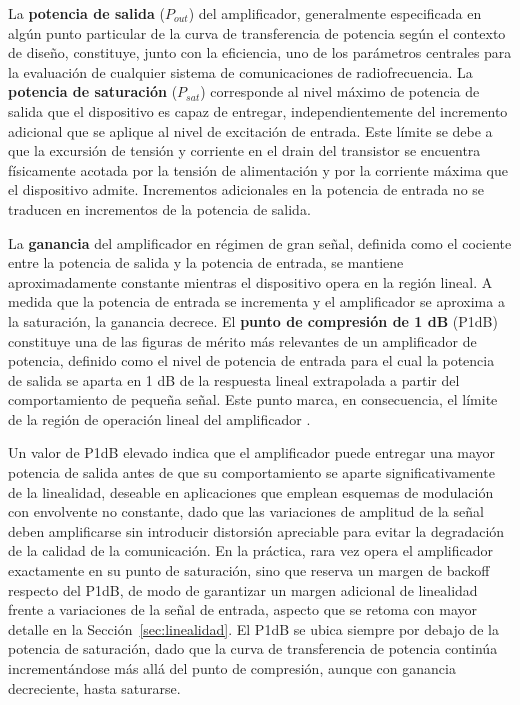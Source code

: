 La \textbf{potencia de salida} ($P_{out}$) del amplificador, generalmente especificada en algún punto particular de la curva de transferencia de potencia según el contexto de diseño, constituye, junto con la eficiencia, uno de los parámetros centrales para la evaluación de cualquier sistema de comunicaciones de radiofrecuencia. La \textbf{potencia de saturación} ($P_{sat}$) corresponde al nivel máximo de potencia de salida que el dispositivo es capaz de entregar, independientemente del incremento adicional que se aplique al nivel de excitación de entrada. Este límite se debe a que la excursión de tensión y corriente en el drain del transistor se encuentra físicamente acotada por la tensión de alimentación y por la corriente máxima que el dispositivo admite. Incrementos adicionales en la potencia de entrada no se traducen en incrementos de la potencia de salida.

La \textbf{ganancia} del amplificador en régimen de gran señal, definida como el cociente entre la potencia de salida y la potencia de entrada, se mantiene aproximadamente constante mientras el dispositivo opera en la región lineal. A medida que la potencia de entrada se incrementa y el amplificador se aproxima a la saturación, la ganancia decrece. El \textbf{punto de compresión de 1 dB} (P1dB) constituye una de las figuras de mérito más relevantes de un amplificador de potencia, definido como el nivel de potencia de entrada para el cual la potencia de salida se aparta en 1 dB de la respuesta lineal extrapolada a partir del comportamiento de pequeña señal. Este punto marca, en consecuencia, el límite de la región de operación lineal del amplificador \cite[pp.~512--513]{pozar2011}.

Un valor de P1dB elevado indica que el amplificador puede entregar una mayor potencia de salida antes de que su comportamiento se aparte significativamente de la linealidad, deseable en aplicaciones que emplean esquemas de modulación con envolvente no constante, dado que las variaciones de amplitud de la señal deben amplificarse sin introducir distorsión apreciable para evitar la degradación de la calidad de la comunicación. En la práctica, rara vez opera el amplificador exactamente en su punto de saturación, sino que reserva un margen de backoff respecto del P1dB, de modo de garantizar un margen adicional de linealidad frente a variaciones de la señal de entrada, aspecto que se retoma con mayor detalle en la Sección~\ref{sec:linealidad}. El P1dB se ubica siempre por debajo de la potencia de saturación, dado que la curva de transferencia de potencia continúa incrementándose más allá del punto de compresión, aunque con ganancia decreciente, hasta saturarse.

